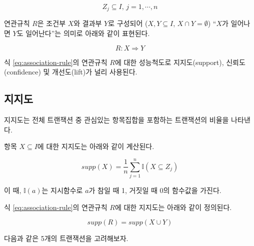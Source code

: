 \documentclass[
]{book}
\begin{document}
\begin{equation*}
Z_j \subseteq I, \, j = 1, \cdots, n
\end{equation*}

연관규칙 \(R\)은 조건부 \(X\)와 결과부 \(Y\)로 구성되어 (\(X, Y \subseteq I\), \(X \cap Y = \emptyset\)) ``\(X\)가 일어나면 \(Y\)도 일어난다''는 의미로 아래와 같이 표현된다.

\begin{equation}
R: X \Rightarrow Y \label{eq:association-rule}
\end{equation}

식 \eqref{eq:association-rule}의 연관규칙 \(R\)에 대한 성능척도로 지지도(support), 신뢰도(confidence) 및 개선도(lift)가 널리 사용된다.

\hypertarget{association-rule-support}{%
\subsection{지지도}\label{association-rule-support}}

지지도는 전체 트랜잭션 중 관심있는 항목집합을 포함하는 트랜잭션의 비율을 나타낸다.

항목 \(X \subseteq I\)에 대한 지지도는 아래와 같이 계산된다.

\begin{equation*}
supp(X) = \frac{1}{n} \sum_{j = 1}^{n} \mathbb{I}(X \subseteq Z_j)
\end{equation*}

이 때, \(\mathbb{I}(a)\)는 지시함수로 \(a\)가 참일 때 1, 거짓일 때 0의 함수값을 가진다.

식 \eqref{eq:association-rule}의 연관규칙 \(R\)에 대한 지지도는 아래와 같이 정의된다.

\begin{equation*}
supp(R) = supp(X \cup Y)
\end{equation*}

다음과 같은 5개의 트랜잭션을 고려해보자.
\end{document}
